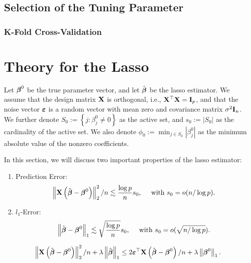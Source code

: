 \subsection{Selection of the Tuning Parameter}

\subsubsection{K-Fold Cross-Validation}

\section{Theory for the Lasso}

Let \(\boldsymbol{\beta}^{0}\) be the true parameter vector, and let \(\hat{\boldsymbol{\beta}}\) be the lasso estimator. We assume that the design matrix \(\mathbf{X}\) is orthogonal, i.e., \(\mathbf{X}^{\top}\mathbf{X}=\mathbf{I}_{p}\), and that the noise vector \(\boldsymbol{\varepsilon}\) is a random vector with mean zero and covariance matrix \(\sigma^{2}\mathbf{I}_{n}\).
We further denote \(S_{0}:=\left\{j:\beta_{j}^{0}\neq 0\right\}\) as the active set, and \(s_{0}:=\left|S_{0}\right|\) as the cardinality of the active set. We also denote \(\phi_{0}:=\min_{j\in S_{0}}\left|\beta_{j}^{0}\right|\) as the minimum absolute value of the nonzero coefficients.

In this section, we will discuss two important properties of the lasso estimator:
\begin{enumerate}
	\item Prediction Error:
	      \begin{equation*}
		      \left\|\mathbf{X}\left(\hat{\boldsymbol{\beta}}-\boldsymbol{\beta}^{0}\right)\right\|_{2}^{2}/n\lesssim \frac{\log p}{n}s_{0}, \quad\ \text{with}\ s_{0}=o(n/\log p).
	      \end{equation*}
	\item \(l_{1}\)-Error:
	      \begin{equation*}
		      \left\|\hat{\boldsymbol{\beta}}-\boldsymbol{\beta}^{0}\right\|_{1}\lesssim\sqrt{\frac{\log p}{n}}s_{0}, \quad\ \text{with}\ s_{0}=o(\sqrt{n/\log p}).
	      \end{equation*}
\end{enumerate}

\begin{lemma}\label{lem:basic-inequality}
	\begin{equation*}
		\left\|\mathbf{X}\left(\hat{\boldsymbol{\beta}}-\boldsymbol{\beta}^{0}\right)\right\|_{2}^{2}/n+\lambda\left\|\hat{\boldsymbol{\beta}}\right\|_{1}\leq 2\boldsymbol{\varepsilon}^{\top}\mathbf{X}\left(\hat{\boldsymbol{\beta}}-\boldsymbol{\beta}^{0}\right)/n+\lambda\left\|\boldsymbol{\beta}^{0}\right\|_{1}.
	\end{equation*}
\end{lemma}

